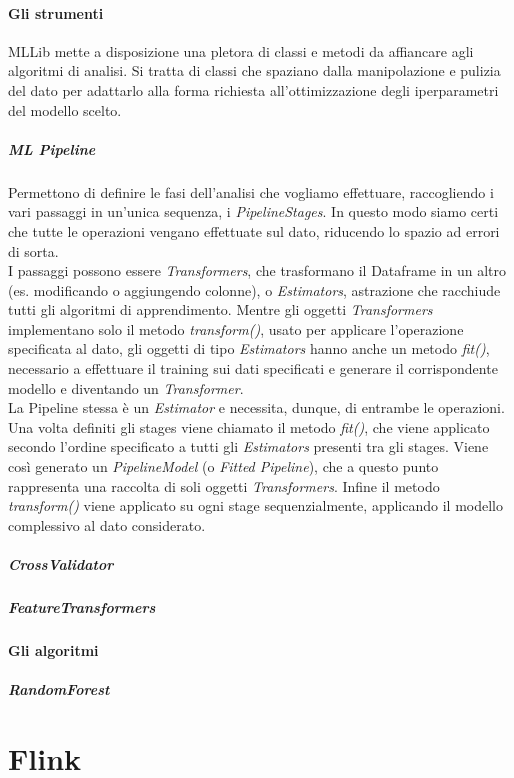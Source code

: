 \paragraph{Gli strumenti} MLLib mette a disposizione una pletora di classi e metodi da affiancare agli algoritmi di analisi. Si tratta di classi che spaziano dalla manipolazione e pulizia del dato per adattarlo alla forma richiesta all'ottimizzazione degli iperparametri del modello scelto.
\subparagraph{ML Pipeline}
Permettono di definire le fasi dell'analisi che vogliamo effettuare, raccogliendo i vari passaggi in un'unica sequenza, i \textit{PipelineStages}. In questo modo siamo certi che tutte le operazioni vengano effettuate sul dato, riducendo lo spazio ad errori di sorta.\\
I passaggi possono essere \textit{Transformers}, che trasformano il Dataframe in un altro (es. modificando o aggiungendo colonne), o \textit{Estimators}, astrazione che racchiude tutti gli algoritmi di apprendimento. Mentre gli oggetti \textit{Transformers} implementano solo il metodo \textit{transform()}, usato per applicare l'operazione specificata al dato, gli oggetti di tipo \textit{Estimators} hanno anche un metodo \textit{fit()}, necessario a effettuare il training sui dati specificati e generare il corrispondente modello e diventando un \textit{Transformer}.\\ 
La Pipeline stessa è un \textit{Estimator} e necessita, dunque, di entrambe le operazioni. Una volta definiti gli stages viene chiamato il metodo \textit{fit()}, che viene applicato secondo l'ordine specificato a tutti gli \textit{Estimators} presenti tra gli stages. Viene così generato un \textit{PipelineModel} (o \textit{Fitted Pipeline}), che a questo punto rappresenta una raccolta di soli oggetti \textit{Transformers}. Infine il metodo \textit{transform()} viene applicato su ogni stage sequenzialmente, applicando il modello complessivo al dato considerato.
\subparagraph{CrossValidator}
\subparagraph{FeatureTransformers}

\paragraph{Gli algoritmi}

\subparagraph{RandomForest}

\pagebreak
\section{Flink}\label{Flink}

